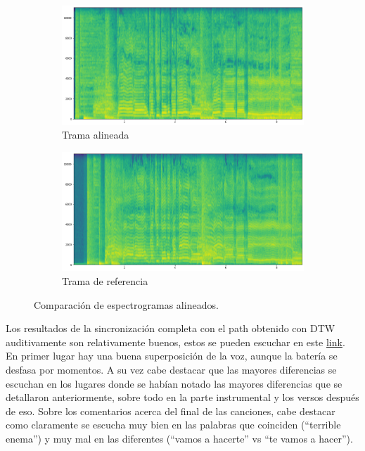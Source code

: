 \documentclass{article}
\begin{document}
\begin{figure}[!htb]
    \centering
    \begin{subfigure}{0.49\textwidth}
        \includegraphics[width=\textwidth]{Alineamientos/espectro_y.png}
        \caption{Trama alineada}
    \end{subfigure}
    \begin{subfigure}{0.49\textwidth}
        \includegraphics[width=\textwidth]{Alineamientos/espectro_audio.png}
        \caption{Trama de referencia}
    \end{subfigure}
    \caption{Comparación de espectrogramas alineados.}
    \label{espectrogramas}
\end{figure}

Los resultados de la sincronización completa con el path obtenido con DTW auditivamente son relativamente buenos, estos se pueden escuchar en este \href{https://drive.google.com/drive/folders/1IeRXLXKivI5VXjGnCVVK31Mhy6xFf_kc?usp=sharing}{link}. En primer lugar hay una buena superposición de la voz, aunque la batería se desfasa por momentos. A su vez cabe destacar que las mayores diferencias se escuchan en los lugares donde se habían notado las mayores diferencias que se detallaron anteriormente, sobre todo en la parte instrumental y los versos después de eso.
Sobre los comentarios acerca del final de las canciones, cabe destacar como claramente se escucha muy bien en las palabras que coinciden (``terrible enema'') y muy mal en las diferentes (``vamos a hacerte'' vs ``te vamos a hacer''). 
\end{document}
